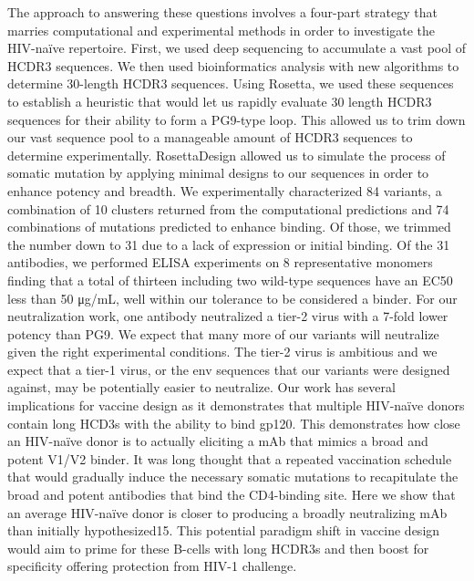 The approach to answering these questions involves a four-part strategy that marries computational and experimental methods in order to investigate the HIV-naïve repertoire. First, we used deep sequencing to accumulate a vast pool of HCDR3 sequences. We then used bioinformatics analysis with new algorithms to determine 30-length HCDR3 sequences. Using Rosetta, we used these sequences to establish a heuristic that would let us rapidly evaluate 30 length HCDR3 sequences for their ability to form a PG9-type loop. This allowed us to trim down our vast sequence pool to a manageable amount of HCDR3 sequences to determine experimentally. RosettaDesign allowed us to simulate the process of somatic mutation by applying minimal designs to our sequences in order to enhance potency and breadth.
We experimentally characterized 84 variants, a combination of 10 clusters returned from the computational predictions and 74 combinations of mutations predicted to enhance binding. Of those, we trimmed the number down to 31 due to a lack of expression or initial binding. Of the 31 antibodies, we performed ELISA experiments on 8 representative monomers finding that a total of thirteen including two wild-type sequences have an EC50 less than 50 μg/mL, well within our tolerance to be considered a binder. For our neutralization work, one antibody neutralized a tier-2 virus with a 7-fold lower potency than PG9. We expect that many more of our variants will neutralize given the right experimental conditions. The tier-2 virus is ambitious and we expect that a tier-1 virus, or the env sequences that our variants were designed against, may be potentially easier to neutralize.
Our work has several implications for vaccine design as it demonstrates that multiple HIV-naïve donors contain long HCD3s with the ability to bind gp120. This demonstrates how close an HIV-naïve donor is to actually eliciting a mAb that mimics a broad and potent V1/V2 binder. It was long thought that a repeated vaccination schedule that would gradually induce the necessary somatic mutations to recapitulate the broad and potent antibodies that bind the CD4-binding site. Here we show that an average HIV-naïve donor is closer to producing a broadly neutralizing mAb than initially hypothesized15. This potential paradigm shift in vaccine design would aim to prime for these B-cells with long HCDR3s and then boost for specificity offering protection from HIV-1 challenge.



